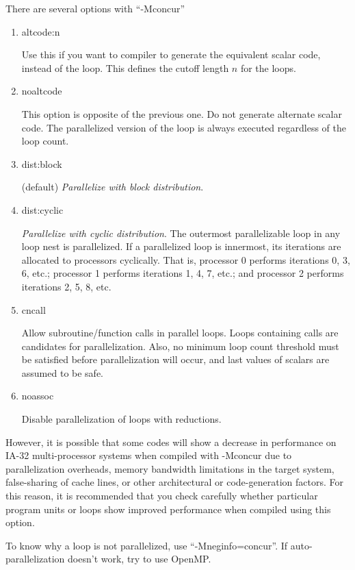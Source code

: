 There are several options with ``-Mconcur''
\begin{enumerate}
\item altcode:n

  Use this if you want to compiler to generate the equivalent scalar
  code, instead of the loop. This defines the cutoff length $n$ for
  the loops.
\item noaltcode

  This option is opposite of the previous one. Do not generate
  alternate scalar code. The parallelized version of the loop is
  always executed regardless of the loop count.

\item dist:block

  (default) {\it Parallelize with block distribution}.

\item dist:cyclic

  {\it Parallelize with cyclic distribution}. The outermost
  parallelizable loop in any loop nest is parallelized. If a
  parallelized loop is innermost, its iterations are allocated to
  processors cyclically. That is, processor 0 performs iterations 0,
  3, 6, etc.; processor 1 performs iterations 1, 4, 7, etc.; and
  processor 2 performs iterations 2, 5, 8, etc.  
\item cncall 

  Allow subroutine/function calls in parallel loops. Loops containing
  calls are candidates for parallelization. Also, no minimum loop
  count threshold must be satisfied before parallelization will occur,
  and last values of scalars are assumed to be safe.

\item noassoc

    Disable parallelization of loops with reductions.
\end{enumerate}

However, it is possible that some codes will show a decrease
in performance on IA-32 multi-processor systems when compiled with
-Mconcur due to parallelization overheads, memory bandwidth
limitations in the target system, false-sharing of cache lines, or
other architectural or code-generation factors. For this reason, it is
recommended that you check carefully whether particular program units
or loops show improved performance when compiled using this option.


To know why a loop is not parallelized, use ``-Mneginfo=concur''. If
auto-parallelization doesn't work, try to use OpenMP.

